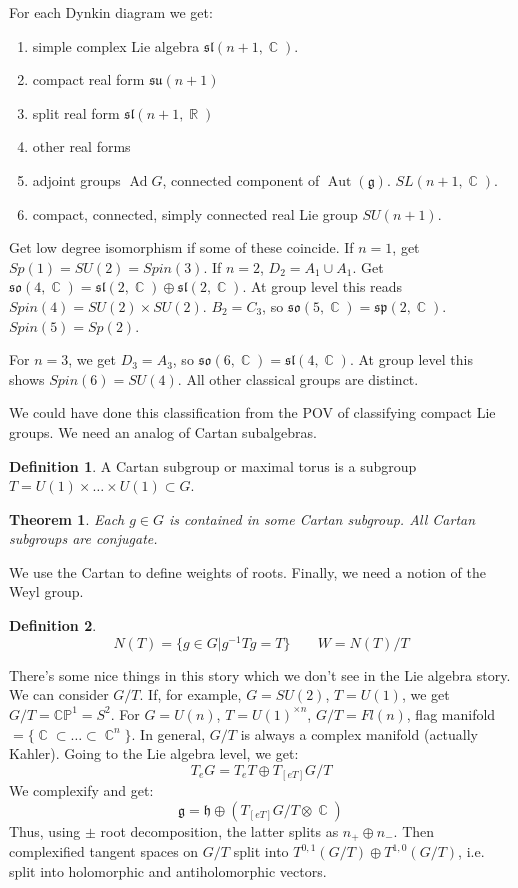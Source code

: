 \documentclass[12 pt]{article}
\DeclareMathOperator {\R} {\mathbb{R}}
\DeclareMathOperator {\C} {\mathbb{C}}
\DeclareMathOperator {\Ad} {Ad}
\DeclareMathOperator {\Aut} {Aut}
\theoremstyle{plain}
\newtheorem*{thm*}{Theorem}
\theoremstyle{definition}
\newtheorem{defn}{Definition}
\theoremstyle{remark}
\begin{document}
For each Dynkin diagram we get:
\begin{enumerate}
\item simple complex Lie algebra $\mathfrak{sl}(n+1, \C)$.
\item compact real form $\mathfrak{su}(n+1)$
\item split real form $\mathfrak{sl}(n+1, \R)$
\item other real forms
\item adjoint groups $\Ad G$, connected component of $\Aut(\mathfrak{g})$. $SL(n+1, \C)$.
\item compact, connected, simply connected real Lie group $SU(n+1)$.
\end{enumerate}
Get low degree isomorphism if some of these coincide. If $n=1$, get $Sp(1) = SU(2) = Spin(3)$. If $n = 2$, $D_2 = A_1 \cup A_1$. Get $\mathfrak{so}(4,\C) = \mathfrak{sl}(2,\C) \oplus \mathfrak{sl}(2,\C)$. At group level this reads $Spin(4) = SU(2) \times SU(2)$. $B_2 = C_3$, so $\mathfrak{so}(5,\C) = \mathfrak{sp}(2, \C)$. $Spin(5) = Sp(2)$.

For $n=3$, we get $D_3 = A_3$, so $\mathfrak{so}(6, \C) = \mathfrak{sl}(4,\C)$. At group level this shows $Spin(6) = SU(4)$. All other classical groups are distinct.

We could have done this classification from the POV of classifying compact Lie groups. We need an analog of Cartan subalgebras.
\begin{defn}
A Cartan subgroup or maximal torus is a subgroup $T = U(1) \times \dots \times U(1) \subset G$. 
\end{defn}
\begin{thm*}
Each $g\in G$ is contained in some Cartan subgroup. All Cartan subgroups are conjugate.
\end{thm*}
We use the Cartan to define weights of roots. Finally, we need a notion of the Weyl group.
\begin{defn}
\[    N(T) = \{  g \in G | g^{-1} T g = T \}  \;\;\;\;\;\;\; W = N(T) / T   \]
\end{defn}
There's some nice things in this story which we don't see in the Lie algebra story. We can consider $G/T$. If, for example, $G = SU(2)$, $T = U(1)$, we get $G/T = \mathbb{CP}^1 = S^2$. For $G = U(n)$, $T = U(1)^{\times n}$, $G/T = Fl(n)$, flag manifold $= \{  \C \subset \dots \subset \C^n \}$. In general, $G/T$ is always a complex manifold (actually Kahler). Going to the Lie algebra level, we get:
\[        T_e G = T_e T \oplus T_{[eT]} G/T        \]
We complexify and get:
\[        \mathfrak{g} = \mathfrak{h} \oplus (T_{[eT]} G/T \otimes \C)      \]
Thus, using $\pm$ root decomposition, the latter splits as $n_+ \oplus n_-$. Then complexified tangent spaces on $G/T$ split into $T^{0,1} (G/T) \oplus T^{1,0} (G/T)$, i.e. split into holomorphic and antiholomorphic vectors.
\end{document}
